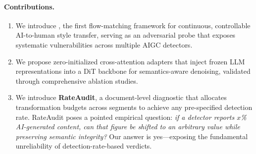 \paragraph{Contributions.}
\begin{enumerate}
    \item We introduce \styleshield{}, the first flow-matching
    framework for continuous, controllable AI-to-human style transfer,
    serving as an adversarial probe that exposes systematic
    vulnerabilities across multiple AIGC detectors.

    \item We propose zero-initialized cross-attention adapters that
    inject frozen LLM representations into a DiT backbone for
    semantics-aware denoising, validated through comprehensive
    ablation studies.

    \item We introduce \textbf{RateAudit}, a document-level diagnostic
    that allocates transformation budgets across segments to
    achieve any pre-specified detection rate.  RateAudit poses a
    pointed empirical question: \emph{if a detector reports $x$\%
    AI-generated content, can that figure be shifted to an arbitrary
    value while preserving semantic integrity?}  Our answer is
    yes---exposing the fundamental unreliability of
    detection-rate-based verdicts.
\end{enumerate}